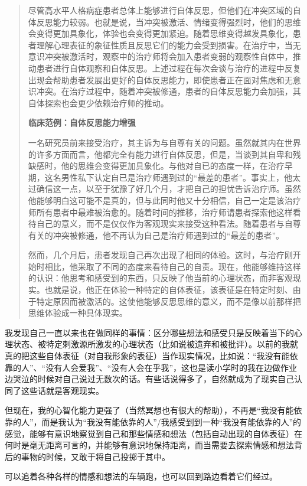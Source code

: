 \blockquote{
    尽管高水平人格病症患者总体上能够进行自体反思，但他们在冲突区域的自体反思能力较弱。也就是说，当冲突被激活、情绪变得强烈时，他们的思维会变得更加具象化，体验也会变得更加紧迫。随着思维变得越发具象化，患者理解心理表征的象征性质且反思它们的能力会受到损害。在治疗中，当无意识冲突被激活时，观察中的治疗师将会加入患者变弱的观察性自体中，推动患者进行自体观察和自体反思。上述过程在每次会谈与治疗的进程中反复出现会帮助患者发展出更好的自体反思能力，即使患者正在面对焦虑和无意识冲突。在治疗过程中，随着冲突被修通，患者的自体反思能力会加强，其自体探索也会更少依赖治疗师的推动。

    \textbf{临床范例：自体反思能力增强}

    一名研究员前来接受治疗，其主诉为与自尊有关的问题。虽然就其内在世界的许多方面而言，他都完全有能力进行自体反思，但是，当谈到其自卑和残缺感时，他的思维会变得更加具象化。与他对自已的态度一样，在治疗早期，这名男性私下认定自已是治疗师遇到过的“最差的患者”。事实上，他太过确信这一点，以至于犹豫了好几个月，才把自己的担忧告诉治疗师。虽然他能够明白这可能不是真的，但与此同时他又十分相信，自己一定是该治疗师所有患者中最难被治愈的。随着时间的推移，治疗师请患者探索他这样看待自己的意义，而不是仅仅作为客观现实来接受这种看法。随着患者与自尊有关的冲突被修通，他不再认为自己是治疗师遇到过的“最差的患者”。

    然而，几个月后，患者发现自己再次出现了相同的体验。这时，与治疗刚开始时相比，他采取了不同的态度来看待自己的自责。现在，他能够维持这样的认识：他思考和感受到的东西，只反映了他当前的心理状态，而非客观现实。也就是说，他正在体验一种特定的自体表征，该表征是在特定时刻、由于特定原因而被激活的。这使他能够反思思维的意义，而不是像以前那样把思维体验成一种具体现实。

}

我发现自己一直以来也在做同样的事情：区分哪些想法和感受只是反映着当下的心理状态、被特定刺激源所激发的心理状态（比如说被遗弃和被批评）。以前的我就真的把这些自体表征（对自我形象的表征）当作现实情况，比如说：“我没有能依靠的人”、“没有人会爱我”、“没有人会在乎我”，这也是读小学时的我在边做作业边哭泣的时候对自己说过无数次的话。有些话说得多了，自然就成为了现实\pozhehao{}自己认同了这些话就是客观现实。

但现在，我的心智化能力更强了（当然冥想也有很大的帮助），不再是“我没有能依靠的人”，而是我认为“我没有能依靠的人”/我感受到到一种“我没有能依靠的人”的感觉，能够有意识地察觉到自己和那些情感和想法（包括自动出现的自体表征）在何时是毫无距离可言的，并能够有意识地保持距离，而当需要去探索情感和想法背后的事物的时候，又敢于将自己投掷于其中。

可以追着各种各样的情感和想法的车辆跑，也可以回到路边看着它们经过。

